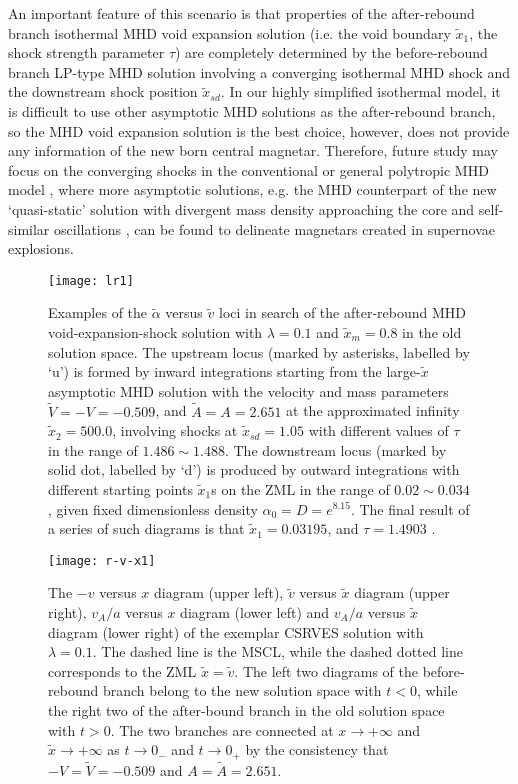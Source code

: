 \documentclass[fleqn,usenatbib]{mnras}
\begin{document}
An important feature of this scenario is that properties of the after-rebound branch isothermal MHD void expansion solution (i.e. the void boundary $\widetilde{x}_{1}$, the shock strength parameter $\tau$) are completely determined by the before-rebound branch LP-type MHD solution involving a converging isothermal MHD shock and the downstream shock position $\widetilde{x}_{sd}$. In our highly simplified isothermal model, it is difficult to use other asymptotic MHD solutions as the after-rebound branch, so the MHD void expansion solution is the best choice, however, does not provide any information of the new born central magnetar. Therefore, future study may focus on the converging shocks in the conventional or general polytropic MHD model \citep{wang2008dynamic, lou2010general}, where more asymptotic solutions, e.g. the MHD counterpart of the new ‘quasi-static’ solution with divergent mass density approaching the core and self-similar oscillations \citep{lou2006new}, can be found to delineate magnetars created in supernovae explosions.

\begin{figure}
\centering
\texttt{[image: lr1]}
\caption{Examples of the $\widetilde{\alpha}$ versus $\widetilde{v}$ loci in search of the after-rebound MHD void-expansion-shock solution with $\lambda=0.1$ and $\widetilde{x}_{m}=0.8$ in the old solution space. The upstream locus (marked by asterisks, labelled by `u') is formed by inward integrations starting from the large-$\widetilde{x}$ asymptotic MHD solution with the velocity and mass parameters $\widetilde{V}=-V=-0.509$, and $\widetilde{A}=A=2.651$ at the approximated infinity $\widetilde{x}_{2}=500.0$, involving shocks at $\widetilde{x}_{sd}=1.05$ with different values of $\tau$ in the range of $1.486\sim 1.488$. The downstream locus (marked by solid dot, labelled by `d') is produced by outward integrations with different starting points $\widetilde{x}_{1}$s on the ZML in the range of $0.02\sim 0.034$, given fixed dimensionless density $\alpha_{0}=D=e^{8.15}$. The final result of a series of such diagrams is that $\widetilde{x}_{1}=0.03195$, and $\tau=1.4903$ .}
\label{fa2}
\end{figure}

\begin{figure}
\centering
\texttt{[image: r-v-x1]}
\caption{The $-v$ versus $x$ diagram (upper left), $\widetilde{v}$ versus $\widetilde{x}$ diagram (upper right), $v_{A}/a$ versus $x$ diagram (lower left) and $v_{A}/a$ versus $\widetilde{x}$ diagram (lower right) of the exemplar CSRVES solution with $\lambda=0.1$. The dashed line is the MSCL, while the dashed dotted line corresponds to the ZML $\widetilde{x}=\widetilde{v}$. The left two diagrams of the before-rebound branch belong to the new solution space with $t<0$, while the right two of the after-bound branch in the old solution space with $t>0$. The two branches are connected at $x\rightarrow +\infty$ and $\widetilde{x}\rightarrow +\infty$ as $t\rightarrow 0_{-}$ and $t\rightarrow 0_{+}$ by the consistency that $-V=\widetilde{V}=-0.509$ and $A=\widetilde{A}=2.651$.}
\label{fa3}
\end{figure}
\end{document}

